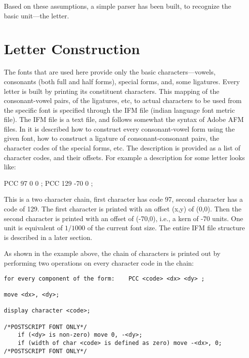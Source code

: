 \documentclass[11pt]{article}
\begin{document}
Based on these assumptions, a simple parser has been built, to recognize
the basic unit---the letter.

\section{Letter Construction}

The fonts that are used here provide only the basic characters---vowels,
consonants (both full and half forms), special forms, and, some ligatures. 
Every letter is built by printing its constituent characters.
This mapping of the consonant-vowel pairs, of the ligatures, etc, to
actual characters to be used from the specific font is specified through
the IFM file (indian language font metric file).
The IFM file is a text file, and follows somewhat the syntax of Adobe AFM
files.
In it is described how to construct every consonant-vowel form using the
given font, how to construct a ligature of consonant-consonant pairs,
the character codes of the special forms, etc.
The description is provided as a list of character codes, and their
offsets.
For example a description for some letter looks like:

PCC 97 0 0 ; PCC 129 -70 0 ;

This is a two character chain, first character has code 97, second
character has a code of 129.
The first character is printed with an offset (x,y) of (0,0).
Then the second character is printed with an offset of (-70,0), i.e., a
kern of -70 units.
One unit is equivalent of $1/1000$ of the current font size.
The entire IFM file structure is described in a later section.

As shown in the example above, the chain of characters is printed out by
performing two operations on every character code in the chain:

\begin{verbatim}
for every component of the form:    PCC <code> <dx> <dy> ;

move <dx>, <dy>;

display character <code>;

/*POSTSCRIPT FONT ONLY*/
    if (<dy> is non-zero) move 0, -<dy>;
    if (width of char <code> is defined as zero) move -<dx>, 0;
/*POSTSCRIPT FONT ONLY*/

\end{verbatim}
\end{document}
